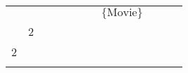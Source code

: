 \begin{table}[]
\begin{tabular}{lllllllllll}
                          &                           &                   &                                                               &                                                                                                                 &                           &                                                             & \cellcolor[HTML]{FC8D59}$\{\text{Movie}\}$                                 &                                                                                          &                                        &                                                                                                                 \\
                          & \cellcolor[HTML]{FC8D59}2 &                   &                                                               &                                                                                                                 &                           &                                                             &                                                                            &                                                                                          &                                        &                                                                                                                 \\
\cellcolor[HTML]{FC8D59}2 &                           &                   &                                                               &                                                                                                                 &                           &                                                             &                                                                            &                                                                                          &                                        &                                                                                                                 \\
                          &                           &                   &                                                               &                                                                                                                 &                           &                                                             &                                                                            &                                                                                          &                                        &                                                                                                                 \\

\end{tabular}
\end{table}
